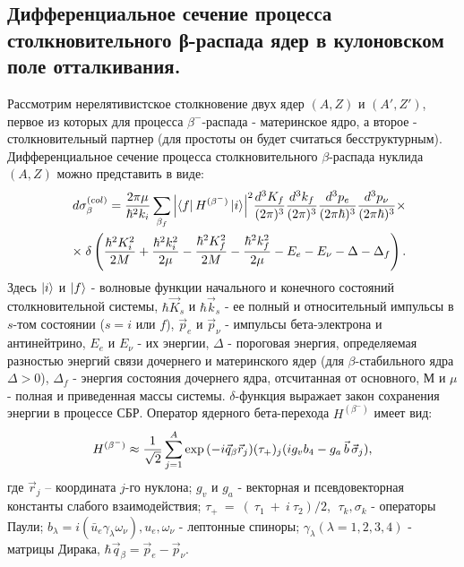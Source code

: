 \documentclass[14pt, a4paper]{article}
\numberwithin{figure}{section}
\numberwithin{equation}{section}
\begin{document}
\subsection{Дифференциальное сечение  процесса столкновительного
	β-распада ядер в кулоновском поле отталкивания.}

Рассмотрим нерелятивистское столкновение двух ядер $(A,Z)$ и $(A',Z')$,
первое из которых для процесса $\beta^-$-распада - материнское ядро, а второе
- столкновительный партнер (для простоты он будет считаться
бесструктурным).
Дифференциальное сечение процесса столкновительного $\beta$-распада
нуклида $(A,Z)$ можно  представить в виде:
\begin{eqnarray}\label{ds}
&&d\sigma^{(col)}_\beta=\frac{2\pi\mu}{\hbar^2k_i}\sum_{\beta_f}{\left| \bra{f} H^{(\beta^-)}
	\ket{i}\right|}^2{d^3 K_f\over{(2\pi)^3}}{d^3 k_f\over{(2\pi)^3}}
{d^3 p_e\over{(2\pi\hbar)^3}}{d^3 p_\nu\over{(2\pi\hbar)^3}}\times\nonumber\\
&&\times\;\delta\left({\hbar^2 K_i^2\over{2 M}}+{\hbar^2 k_i^2\over{2\mu}}-{\hbar^2 K_f^2\over{2 M}}-
{\hbar^2 k_f^2\over{2\mu}}-E_e-E_\nu-\Delta-\Delta_f\right).
\end{eqnarray}
Здесь $\ket{i}$ и $\ket{f}$ - волновые функции начального и конечного состояний
столкновительной системы,
$\hbar \vec K_s$ и $\hbar \vec k_s$ - ее полный и относительный импульсы
в $s$-том состоянии ($s=i$ или $f$),
$\vec p_e$ и $\vec p_\nu$ - импульсы бета-электрона и антинейтрино,
$E_e$ и $E_\nu$ - их энергии,
$\Delta$ - пороговая энергия, определяемая разностью энергий связи
дочернего и материнского ядер (для $\beta$-стабильного ядра $\Delta>0$),
$\Delta_f$  - энергия состояния дочернего ядра, отсчитанная от
основного,
$М$ и $\mu$ - полная и приведенная массы системы.
$\delta$-функция выражает закон сохранения энергии в процессе СБР.
Оператор ядерного бета-перехода  $H^{(\beta^-)}$ имеет вид:
\begin{eqnarray}\label{nH^beta}
H^{(\beta^-)}\approx {{1}\over{\sqrt{2}}}\sum_{j=1}^{A} \exp{( -i \vec q_\beta \vec r_j)}
(\tau_+)_j ( i g_v b_4 - g_a\, \vec b\, \vec \sigma_j ),
\end{eqnarray}
где $\vec r_j$ -- координата $j$-го нуклона;
$g_v$ и $g_a$ - векторная и псевдовекторная константы слабого
взаимодействия;
$\tau_+~=~(~\tau_1~+~i~\tau_2)/2$, $\;\tau_k,\sigma_k$ - операторы Паули;
$b_\lambda=i ( \bar u_e \gamma_\lambda \omega_\nu), u_e, \omega_\nu$ - лептонные
спиноры; $\gamma_\lambda (\lambda = 1,2,3,4 )$ - матрицы Дирака,
$\hbar \vec q_\beta=\vec p_e-\vec p_\nu$.
\end{document}
